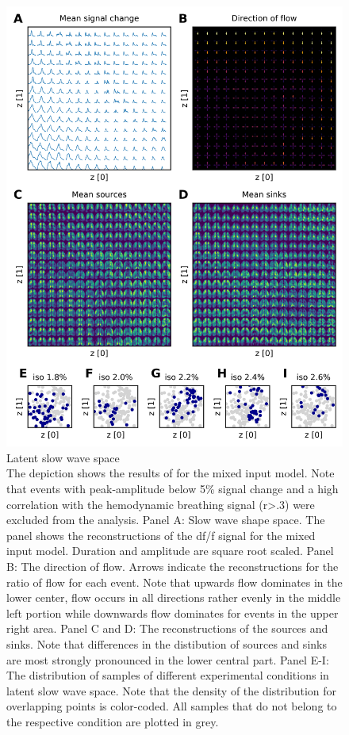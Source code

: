 \begin{figure}[!htb]
\centering
\includegraphics[width=\textwidth,height=\textheight,keepaspectratio]{Figures/latent_slow_wave_space}
\decoRule
\caption[Latent slow wave space]{Latent slow wave space\\The depiction shows the results of for the mixed input model. Note that events with peak-amplitude below 5\% signal change and a high correlation with the hemodynamic breathing signal (r>.3) were excluded from the analysis. Panel A: Slow wave shape space. The panel shows the reconstructions of the df/f signal for the mixed input model. Duration and amplitude are square root scaled. Panel B: The direction of flow. Arrows indicate the reconstructions for the ratio of flow for each event. Note that upwards flow dominates in the lower center, flow occurs in all directions rather evenly in the middle left portion while downwards flow dominates for events in the upper right area. Panel C and D: The reconstructions of the sources and sinks. Note that differences in the distibution of sources and sinks are most strongly pronounced in the lower central part. Panel E-I: The distribution of samples of different experimental conditions in latent slow wave space. Note that the density of the distribution for overlapping points is color-coded. All samples that do not belong to the respective condition are plotted in grey.}
\label{fig:latent_slow_wave_space}
\end{figure}
